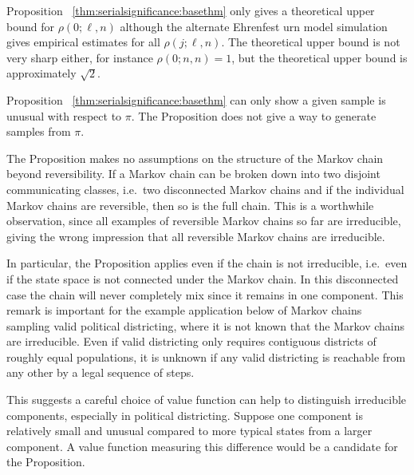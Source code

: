 \documentclass[12pt]{article}
\begin{document}
\begin{remark}
    Proposition~%
    \ref{thm:serialsignificance:basethm} only gives a theoretical upper
    bound for \( \rho(0; \ell, n) \) although the alternate Ehrenfest
    urn model simulation gives empirical estimates for all \( \rho(j;
    \ell, n) \).  The theoretical upper bound is not very sharp either,
    for instance \( \rho(0; n, n) = 1 \), but the
    theoretical upper bound is approximately \( \sqrt{2} \).

\end{remark}

\begin{remark}
    Proposition~%
    \ref{thm:serialsignificance:basethm} can only show a given sample is
    unusual with respect to \( \pi \).  The Proposition does not give a
    way to generate samples from \( \pi \).
\end{remark}

\begin{remark}
    The Proposition makes no assumptions on the structure of the Markov
    chain beyond reversibility.  If a Markov chain can be broken down
    into two disjoint communicating classes, i.e.\ two disconnected
    Markov chains and if the individual Markov chains are reversible,
    then so is the full chain.  This is a worthwhile observation, since
    all examples of reversible Markov chains so far are irreducible,
    giving the wrong impression that all reversible Markov chains are
    irreducible.

    In particular, the Proposition applies even if the chain is not
    irreducible, i.e.\ even if the state space is not connected under
    the Markov chain.  In this disconnected case the chain will never
    completely mix since it remains in one component.  This remark is
    important for the example application below of Markov chains
    sampling valid political districting, where it is not known that the
    Markov chains are irreducible.  Even if valid districting only
    requires contiguous districts of roughly equal populations, it is
    unknown if any valid districting is reachable from any other by a
    legal sequence of steps.

    This suggests a careful choice of value function can help to
    distinguish irreducible components, especially in political
    districting.  Suppose one component is relatively small and unusual
    compared to more typical states from a larger component.  A value
    function measuring this difference would be a candidate for the
    Proposition.
\end{remark}
\end{document}
